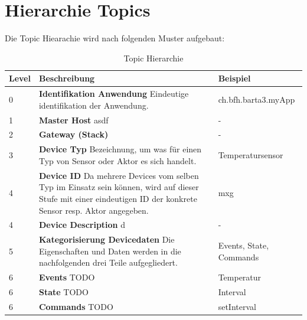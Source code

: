 \section{Hierarchie Topics}


Die Topic Hiearachie wird nach folgenden Muster aufgebaut:


\begin{table}[h!]
\begin{tabularx}{\textwidth}{|l|X|l|}

 \hline
 {\bf Level } & {\bf Beschreibung } & {\bf Beispiel } \\ 
 \hline
 0  &   \textbf{Identifikation Anwendung} \newline Eindeutige identifikation der Anwendung.  &    
  ch.bfh.barta3.myApp   \\ \hline
 
 1  &   \textbf{Master Host}  \newline asdf  &     -   \\ \hline

 2  &   \textbf{Gateway (Stack)}   &     -   \\ \hline

 3  &   \textbf{Device Typ} \newline Bezeichnung, um was für einen Typ von Sensor oder Aktor es sich handelt.  &     Temperatursensor   \\ \hline

 4  &   \textbf{Device ID} \newline Da mehrere Devices vom selben Typ im Einsatz sein können, wird auf dieser Stufe mit einer eindeutigen ID der konkrete Sensor resp. Aktor angegeben.   &    mxg   \\ \hline
 
  4  &   \textbf{Device Description} \newline d   &    -   \\ \hline

 5  &   \textbf{Kategorisierung Devicedaten} \newline  Die Eigenschaften und Daten werden in die nachfolgenden drei Teile aufgegliedert.  &     Events, State, Commands   \\ \hline

 6  &   \textbf{Events} \newline  TODO  &     Temperatur   \\ \hline

 6  &   \textbf{State} \newline  TODO  &     Interval   \\ \hline
 
 6  &   \textbf{Commands} \newline  TODO  &   setInterval   \\ \hline
 
\end{tabularx}
\caption{Topic Hierarchie}
\end{table}

